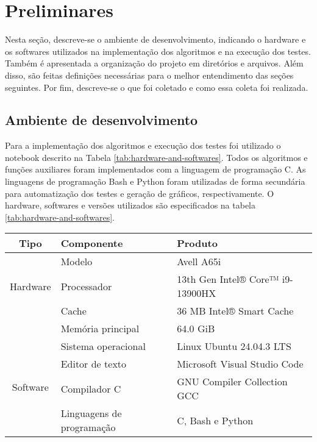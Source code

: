 \section{Preliminares}
Nesta seção, descreve-se o ambiente de desenvolvimento, indicando o hardware e os softwares utilizados na implementação dos algoritmos e na execução dos testes. Também é apresentada a organização do projeto em diretórios e arquivos. Além disso, são feitas definições necessárias para o melhor entendimento das seções seguintes. Por fim, descreve-se o que foi coletado e como essa coleta foi realizada.

\subsection{Ambiente de desenvolvimento}
Para a implementação dos algoritmos e execução dos testes foi utilizado o notebook descrito na Tabela \ref{tab:hardware-and-softwares}. Todos os algoritmos e funções auxiliares foram implementados com a linguagem de programação C. As linguagens de programação Bash e Python foram utilizadas de forma secundária para automatização dos testes e geração de gráficos, respectivamente. O hardware, softwares e versões utilizados são especificados na tabela \ref{tab:hardware-and-softwares}.

\begin{table}[H]
    \centering
    \begin{tabular}{ | c | l | l | }
        \hline
        Tipo                      & Componente                & Produto                          \\
        \hline
        \multirow{3}{*}{Hardware} & Modelo                    & Avell A65i                       \\
                                  & Processador               & 13th Gen Intel® Core™ i9-13900HX \\
                                  & Cache                     & 36 MB Intel® Smart Cache         \\
                                  & Memória principal         & 64.0 GiB                         \\
        \hline
        \multirow{4}{*}{Software} & Sistema operacional       & Linux Ubuntu 24.04.3 LTS         \\
                                  & Editor de texto           & Microsoft Visual Studio Code     \\
                                  & Compilador C              & GNU Compiler Collection GCC      \\
                                  & Linguagens de programação & C, Bash e Python                 \\
        \hline
    \end{tabular}
\end{table}

